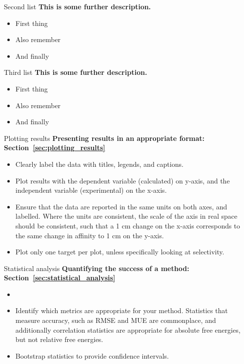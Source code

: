 \documentclass[9pt,bestpractices]{livecoms}
\begin{document}
\begin{Checklists*}
\begin{checklist}{Second list}
\textbf{This is some further description.}
\begin{itemize}
\item First thing
\item Also remember
\item And finally
\end{itemize}
\end{checklist}

\begin{checklist}{Third list}
\textbf{This is some further description.}
\begin{itemize}
\item First thing
\item Also remember
\item And finally
\end{itemize}
\end{checklist}

\begin{checklist}{Plotting results}
\textbf{Presenting results in an appropriate format: Section~\ref{sec:plotting_results}}
\begin{itemize}
\item Clearly label the data with titles, legends, and captions.
\item Plot results with the dependent variable (calculated) on y-axis, and the independent variable (experimental) on the x-axis. 
\item Ensure that the data are reported in the same units on both axes, and labelled. Where the units are consistent, the scale of the axis in real space should be consistent, such that a 1 cm change on the x-axis corresponds to the same change in affinity to 1 cm on the y-axis.
\item Plot only one target per plot, unless specifically looking at selectivity.
\end{itemize}
\end{checklist}

\begin{checklist}{Statistical analysis}
\textbf{Quantifying the success of a method: Section~\ref{sec:statistical_analysis}}
\begin{itemize}
\item 
\item Identify which metrics are appropriate for your method. Statistics that measure accuracy, such as RMSE and MUE are commonplace, and additionally correlation statistics are appropriate for absolute free energies, but not relative free energies.
\item Bootstrap statistics to provide confidence intervals. 
\end{itemize}
\end{checklist}


\end{Checklists*}
\end{document}
